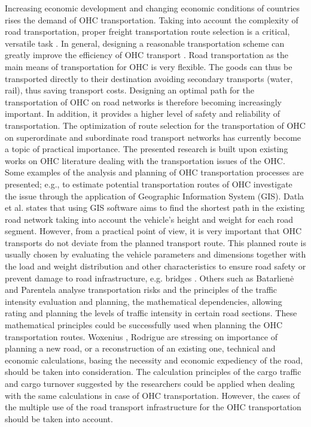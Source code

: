 %

Increasing economic development and changing economic conditions of countries rises the demand of OHC transportation. Taking into account the complexity of road transportation, proper freight transportation route selection is a critical, versatile task \cite{bazaras2013optimal, xu2001methodology, sivilevicius2007dynamics}. In general, designing a reasonable transportation scheme can greatly improve the efficiency of OHC transport \cite{meng2015optimized}. Road transportation as the main means of transportation for OHC is very flexible. The goods can thus be transported directly to their destination avoiding secondary transports (water, rail), thus saving transport costs. Designing an optimal path for the transportation of OHC on road networks is therefore becoming increasingly important. In addition, it provides a higher level of safety and reliability of transportation. The optimization of route selection for the transportation of OHC on superordinate and subordinate road transport networks has currently become a topic of practical importance\cite{geisberger2011efficient}. 
The presented research is built upon existing works on OHC literature dealing with the transportation issues of the OHC. Some examples of the analysis and planning of OHC transportation processes are presented; e.g., to estimate potential transportation routes of OHC \cite{durham2002gis} investigate the issue through the application of Geographic Information System (GIS). Datla et al. \cite{datla2004gis} states that using GIS software aims to find the shortest path in the existing road network taking into account the vehicle’s height and weight for each road segment. However, from a practical point of view, it is very important that OHC transports do not deviate from the planned transport route. This planned route is usually chosen by evaluating the vehicle parameters and dimensions together with the load and weight distribution and other characteristics to ensure road safety or prevent damage to road infrastructure, e.g. bridges \cite{ecmt2006improving, vaitkus2016effect, kombe2017modelling, pauer2017development}.
Others such as Batarlienė \cite{batarliene2007mobile} and Parentela \cite{parentela2002risk} analyse transportation risks and the principles of the traffic intensity evaluation and planning, the mathematical dependencies, allowing rating and planning the levels of traffic intensity in certain road sections. These mathematical principles could be successfully used when planning the OHC transportation routes. Woxenius \cite{woxenius2002organisation, woxenius2002conceptual}, Rodrigue \cite{rodrigue2020geography}are stressing on importance of planning a new road, or a reconstruction of an existing one, technical and economic calculations, basing the necessity and economic expediency of the road, should be taken into consideration. The calculation principles of the cargo traffic and cargo turnover suggested by the researchers could be applied when dealing with the same calculations in case of OHC  transportation. However, the cases of the multiple use of the road transport infrastructure for the OHC transportation should be taken into account. 

